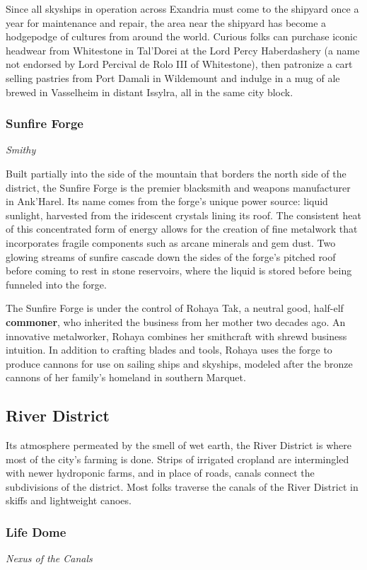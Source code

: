 \documentclass[10pt,a4paper,twoside,fancy,bg=print,twocolumn,openany,nodeprecatedcode]{dndbook}
\begin{document}
Since all skyships in operation across Exandria must come to the shipyard once a year for maintenance and repair, the area near the shipyard has become a hodgepodge of cultures from around the world. Curious folks can purchase iconic headwear from Whitestone in Tal'Dorei at the Lord Percy Haberdashery (a name not endorsed by Lord Percival de Rolo III of Whitestone), then patronize a cart selling pastries from Port Damali in Wildemount and indulge in a mug of ale brewed in Vasselheim in distant Issylra, all in the same city block.

\subsubsection{Sunfire Forge}
\textit{Smithy}

Built partially into the side of the mountain that borders the north side of the district, the Sunfire Forge is the premier blacksmith and weapons manufacturer in Ank'Harel. Its name comes from the forge's unique power source: liquid sunlight, harvested from the iridescent crystals lining its roof. The consistent heat of this concentrated form of energy allows for the creation of fine metalwork that incorporates fragile components such as arcane minerals and gem dust. Two glowing streams of sunfire cascade down the sides of the forge's pitched roof before coming to rest in stone reservoirs, where the liquid is stored before being funneled into the forge.

The Sunfire Forge is under the control of Rohaya Tak, a neutral good, half-elf \textbf{commoner}, who inherited the business from her mother two decades ago. An innovative metalworker, Rohaya combines her smithcraft with shrewd business intuition. In addition to crafting blades and tools, Rohaya uses the forge to produce cannons for use on sailing ships and skyships, modeled after the bronze cannons of her family's homeland in southern Marquet.

\subsection{River District}
Its atmosphere permeated by the smell of wet earth, the River District is where most of the city's farming is done. Strips of irrigated cropland are intermingled with newer hydroponic farms, and in place of roads, canals connect the subdivisions of the district. Most folks traverse the canals of the River District in skiffs and lightweight canoes.

\subsubsection{Life Dome}
\textit{Nexus of the Canals}
\end{document}
